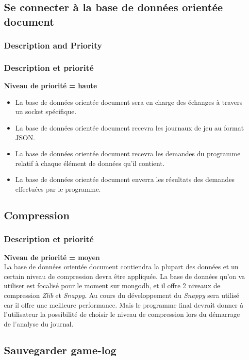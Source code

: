 \documentclass{scrreprt}
\begin{document}
\subsection{Se connecter à la base de données orientée document }
\subsubsection{Description and Priority}
\subsubsection{Description et priorité}
\textbf{Niveau de priorité = haute}\\
\begin{itemize}
\item La base de données orientée document sera en charge des échanges à travers un socket spécifique.
\item La base de données orientée document recevra les journaux de jeu au format JSON.
\item La base de données orientée document recevra les demandes du programme relatif à chaque élément de données qu'il contient.
\item La base de données orientée document enverra les résultats des demandes effectuées par le programme.
\end{itemize}


\subsection{Compression}
\subsubsection{Description et priorité}
\textbf{Niveau de priorité = moyen}\\

La base de données orientée document contiendra la plupart des données et un certain niveau de compression devra être appliquée.
La base de données qu’on va utiliser est focalisé pour le moment sur mongodb, et il offre 2 niveaux de compression \textit{Zlib} et \textit{Snappy}.
Au cours du développement du \textit{Snappy} sera utilisé car il offre une meilleure performance.
Mais le programme final devrait donner à l'utilisateur la possibilité de choisir le niveau de compression lors du démarrage de l'analyse du journal.

\subsection{Sauvegarder game-log}
\end{document}
